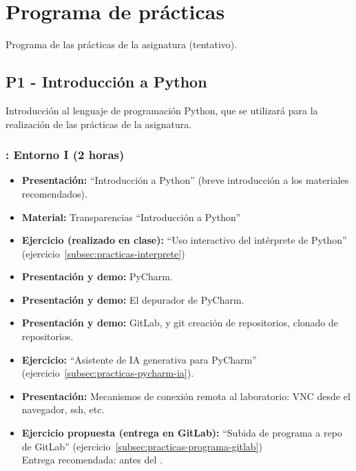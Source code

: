 \documentclass[a4paper,12pt]{article}
\begin{document}
\newpage

\section{Programa de prácticas}

Programa de las prácticas de la asignatura (tentativo).

\subsection{P1 - Introducción a Python}

Introducción al lenguaje de programación Python, que se utilizará para la realización de las prácticas de la asignatura.

\subsubsection{\juevesA: Entorno I  (2 horas)}
\label{cal:juevesA}

\begin{itemize}
\item \textbf{Presentación:} ``Introducción a Python'' (breve introducción a los materiales recomendados).
\item \textbf{Material:} Transparencias ``Introducción a Python''
\item \textbf{Ejercicio (realizado en clase):} ``Uso interactivo del intérprete de Python'' (ejercicio~\ref{subsec:practicas-interprete})
\item \textbf{Presentación y demo:} PyCharm.
\item \textbf{Presentación y demo:} El depurador de PyCharm.
\item \textbf{Presentación y demo:} GitLab, y git creación de repositorios, clonado de repositorios.
\item \textbf{Ejercicio:} ``Asistente de IA generativa para PyCharm'' (ejercicio~\ref{subsec:practicas-pycharm-ia}).
\item \textbf{Presentación:} Mecanismos de conexión remota al laboratorio: VNC desde el navegador, ssh, etc.
\item \textbf{Ejercicio propuesta (entrega en GitLab):} ``Subida de programa a repo de GitLab'' (ejercicio~\ref{subsec:practicas-programa-gitlab}) \\
   Entrega recomendada: antes del \juevesB.
\end{itemize}
\end{document}
